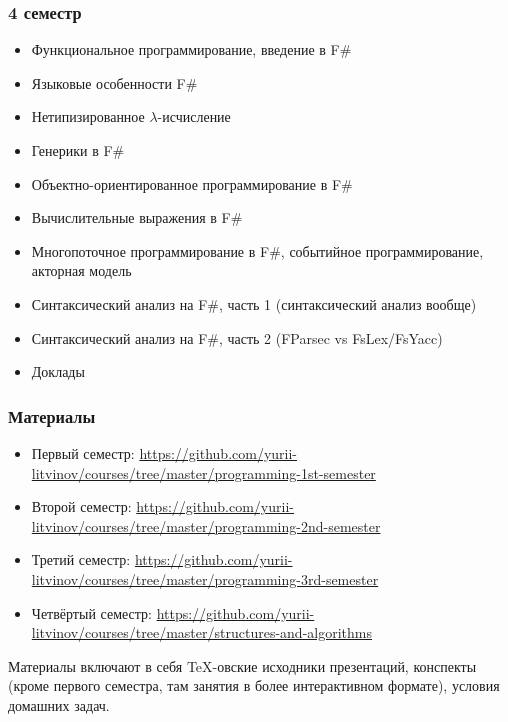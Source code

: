 \documentclass[xetex,mathserif,serif]{beamer}
\begin{document}
    \begin{frame}
        \frametitle{4 семестр}
        \begin{scriptsize}
            \begin{itemize}
                \item Функциональное программирование, введение в F\#
                \item Языковые особенности F\#
                \item Нетипизированное $\lambda$-исчисление
                \item Генерики в F\#
                \item Объектно-ориентированное программирование в F\#
                \item Вычислительные выражения в F\#
                \item Многопоточное программирование в F\#, событийное программирование, акторная модель
                \item Синтаксический анализ на F\#, часть 1 (синтаксический анализ вообще)
                \item Синтаксический анализ на F\#, часть 2 (FParsec vs FsLex/FsYacc)
                \item Доклады
            \end{itemize}
        \end{scriptsize}
    \end{frame}

    \begin{frame}
        \frametitle{Материалы}
        \begin{scriptsize}
            \begin{itemize}
                \item Первый семестр: \url{https://github.com/yurii-litvinov/courses/tree/master/programming-1st-semester}
                \item Второй семестр: \url{https://github.com/yurii-litvinov/courses/tree/master/programming-2nd-semester}
                \item Третий семестр: \url{https://github.com/yurii-litvinov/courses/tree/master/programming-3rd-semester}
                \item Четвёртый семестр: \url{https://github.com/yurii-litvinov/courses/tree/master/structures-and-algorithms}
            \end{itemize}
        \end{scriptsize}
        Материалы включают в себя TeX-овские исходники презентаций, конспекты (кроме первого семестра, там занятия в более интерактивном формате), условия домашних задач.
    \end{frame}
\end{document}
